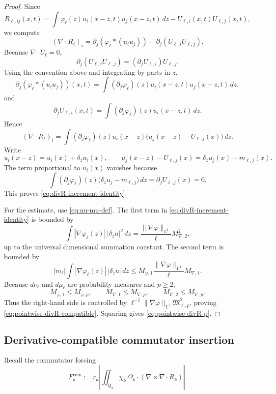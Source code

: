 \documentclass[11pt]{article}
\numberwithin{equation}{section}
\theoremstyle{plain}
\theoremstyle{definition}
\theoremstyle{remark}
\begin{document}
\begin{proof}
Since
\[
R_{\ell,ij}(x,t)
=
\int\varphi_\ell(z)u_i(x-z,t)u_j(x-z,t)\,dz
-U_{\ell,i}(x,t)U_{\ell,j}(x,t),
\]
we compute
\[
(\nabla\!\cdot R_\ell)_i
=\partial_j(\varphi_\ell*(u_i u_j))-
\partial_j(U_{\ell,i}U_{\ell,j}).
\]
Because $\nabla\!\cdot U_\ell=0$,
\[
\partial_j(U_{\ell,i}U_{\ell,j})=(\partial_jU_{\ell,i})U_{\ell,j}.
\]
Using the convention above and integrating by parts in $z$,
\[
\partial_j(\varphi_\ell*(u_i u_j))(x,t)
=
\int(\partial_j\varphi_\ell)(z)u_i(x-z,t)u_j(x-z,t)\,dz,
\]
and
\[
\partial_jU_{\ell,i}(x,t)
=
\int(\partial_j\varphi_\ell)(z)u_i(x-z,t)\,dz.
\]
Hence
\[
(\nabla\!\cdot R_\ell)_i
=
\int(\partial_j\varphi_\ell)(z)u_i(x-z)\bigl(u_j(x-z)-U_{\ell,j}(x)\bigr)\,dz.
\]
Write
\[
u_i(x-z)=u_i(x)+\delta_z u_i(x),
\qquad
u_j(x-z)-U_{\ell,j}(x)=\delta_z u_j(x)-m_{\ell,j}(x).
\]
The term proportional to $u_i(x)$ vanishes because
\[
\int(\partial_j\varphi_\ell)(z)\bigl(\delta_z u_j-m_{\ell,j}\bigr)\,dz
=
\partial_jU_{\ell,j}(x)=0.
\]
This proves \eqref{eq:divR-increment-identity}.

For the estimate, use \eqref{eq:nu-mu-def}.  The first term in \eqref{eq:divR-increment-identity} is bounded by
\[
\int |\nabla\varphi_\ell(z)|\,|\delta_z u|^2\,dz
=
\frac{\|\nabla\varphi\|_{L^1}}{\ell}M_{\nabla,2}^2,
\]
up to the universal dimensional summation constant.  The second term is bounded by
\[
|m_\ell|\int |\nabla\varphi_\ell(z)|\,|\delta_z u|\,dz
\le
M_{\varphi,1}\frac{\|\nabla\varphi\|_{L^1}}{\ell}M_{\nabla,1}.
\]
Because $d\nu_\ell$ and $d\mu_\ell$ are probability measures and $p\ge2$,
\[
M_{\varphi,1}\le M_{\varphi,p},
\qquad
M_{\nabla,1}\le M_{\nabla,p},
\qquad
M_{\nabla,2}\le M_{\nabla,p}.
\]
Thus the right-hand side is controlled by $\ell^{-1}\|\nabla\varphi\|_{L^1}\mathfrak M_{\ell,p}^2$, proving \eqref{eq:pointwise-divR-compatible}.  Squaring gives \eqref{eq:pointwise-divR-p}.
\end{proof}

\subsection{Derivative-compatible commutator insertion}

Recall the commutator forcing
\begin{equation}\label{eq:Fcomm-def-repeat}
F_k^{\mathrm{com}}
:=
r_k\left|
\iint_{Q_k}\chi_k\,
\Omega_k\cdot(\nabla\times\nabla\!\cdot R_k)
\right|.
\end{equation}
\end{document}
